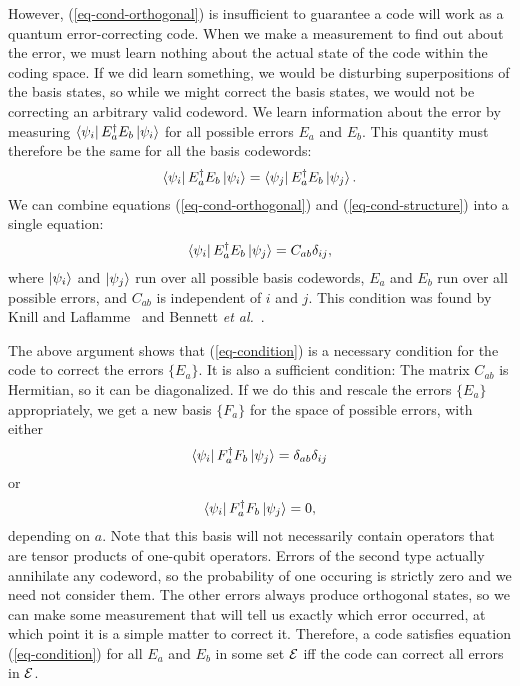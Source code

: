 However, (\ref{eq-cond-orthogonal}) is insufficient to guarantee a code will
work as a quantum error-correcting code.  When we make a measurement to find
out about the error, we must learn nothing about the actual state of the code
within the coding space.  If we did learn something, we would be disturbing
superpositions of the basis states, so while we might correct the basis
states, we would not be correcting an arbitrary valid codeword.  We learn
information about the error by measuring $\bra{\psi_i} E_a^\dagger E_b
\ket{\psi_i}$ for all possible errors $E_a$ and $E_b$.  This quantity must
therefore be the same for all the basis codewords:
\begin{equation}
	\bra{\psi_i} E_a^\dagger E_b \ket{\psi_i} = \bra{\psi_j} E_a^\dagger E_b
	\ket{\psi_j}.
	\label{eq-cond-structure}
\end{equation}
We can combine equations (\ref{eq-cond-orthogonal}) and
(\ref{eq-cond-structure}) into a single equation:
\begin{equation}
	\bra{\psi_i} E_a^\dagger E_b \ket{\psi_j} = C_{ab} \delta_{ij},
	\label{eq-condition}
\end{equation}
where $\ket{\psi_i}$ and $\ket{\psi_j}$ run over all possible basis
codewords, $E_a$ and $E_b$ run over all possible errors, and $C_{ab}$ is
independent of $i$ and $j$.  This condition was found by Knill and
Laflamme~\cite{knill-laflamme-theory} and Bennett {\it et
al.}~\cite{bennett-tome}.

The above argument shows that (\ref{eq-condition}) is a necessary
condition for the code to correct the errors $\{E_a\}$.  It is also a
sufficient condition:  The matrix $C_{ab}$ is Hermitian, so it can be
diagonalized.  If we do this and rescale the errors $\{E_a\}$ appropriately, we
get a new basis $\{F_a\}$ for the space of possible errors, with either
\begin{equation}
	\bra{\psi_i} F_a^\dagger F_b \ket{\psi_j} = \delta_{ab} \delta_{ij}
\end{equation}
or
\begin{equation}
	\bra{\psi_i} F_a^\dagger F_b \ket{\psi_j} = 0,
\end{equation}
depending on $a$.  Note that this basis will not necessarily contain
operators that are tensor products of one-qubit operators.  Errors of the
second type actually annihilate any codeword, so the probability of one
occuring is strictly zero and we need not consider them.  The other errors
always produce orthogonal states, so we can make some measurement that
will tell us exactly which error occurred, at which point it is a simple
matter to correct it.  Therefore, a code satisfies equation
(\ref{eq-condition}) for all $E_a$ and $E_b$ in some set ${\cal E}$ iff the
code can correct all errors in ${\cal E}$.

